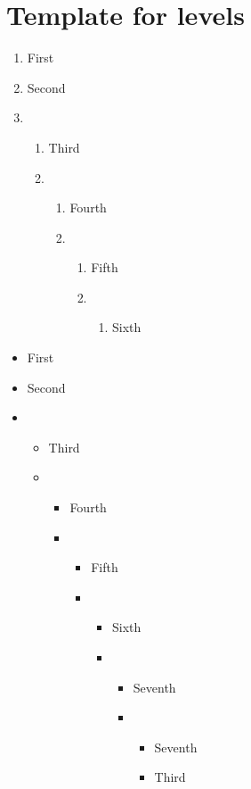 \section{Template for levels}
	\begin{enumerate}
		\item{First}
		\item{Second}
		\item{
			\begin{enumerate}
				\item{Third}
				\item{
					\begin{enumerate}
						\item{Fourth}
						\item{
							\begin{enumerate}
								\item{Fifth}
								\item{
									\begin{enumerate}
										\item{
											Sixth
										}
									\end{enumerate}
								}
							\end{enumerate}
						}
					\end{enumerate}
				}
			\end{enumerate}
		}
	\end{enumerate}
	\begin{itemize}
		\item{First}
		\item{Second}
		\item{
			\begin{itemize}
				\item{Third}
				\item{
					\begin{itemize}
						\item{Fourth}
						\item{
							\begin{itemize}
								\item{Fifth}
								\item{
									\begin{itemize}
										\item{Sixth}
										\item{
											\begin{itemize}
												\item{Seventh}
												\item{
													\begin{itemize}
														\item{Seventh}
														\item{
															Third
														}
													\end{itemize}
												}
											\end{itemize}
										}
									\end{itemize}
								}
							\end{itemize}
						}
					\end{itemize}
				}
			\end{itemize}
		}
	\end{itemize}
